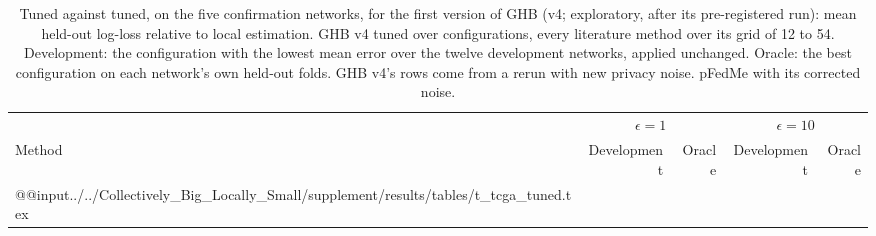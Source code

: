 \documentclass[acmsmall,screen,nonacm]{acmart}
\theoremstyle{acmdefinition}
\begin{document}
\begin{table}[t]
\caption{Tuned against tuned, on the five confirmation networks, for the first version of GHB (v4; exploratory, after its pre-registered run): mean held-out log-loss relative to local estimation. GHB v4 tuned over \SimTTConfigs{} configurations, every literature method over its grid of 12 to 54. Development: the configuration with the lowest mean error over the twelve development networks, applied unchanged. Oracle: the best configuration on each network's own held-out folds. GHB v4's rows come from a rerun with new privacy noise. pFedMe with its corrected noise.}
\label{tab:tcga-tuned}
\scriptsize
\begin{tabular}{@{}lrrrr@{}}
\toprule
 & \multicolumn{2}{c}{$\epsilon=1$} & \multicolumn{2}{c}{$\epsilon=10$}\\
\cmidrule(lr){2-3}\cmidrule(l){4-5}
Method & Development & Oracle & Development & Oracle\\
\midrule
\csname @@input\endcsname../../Collectively_Big_Locally_Small/supplement/results/tables/t_tcga_tuned.tex 
\bottomrule
\end{tabular}
\end{table}
\end{document}
